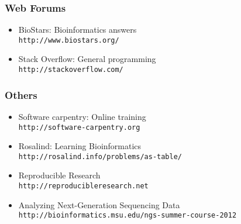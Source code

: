 \documentclass[ChapterTOCs,krantz2]{krantz} %
\begin{document}
\subsubsection{Web Forums}
\begin{itemize}
\item BioStars: Bioinformatics answers \\\texttt{http://www.biostars.org/}
\item Stack Overflow: General programming\\ \texttt{http://stackoverflow.com/}
\end{itemize}

\subsubsection{Others}
\begin{itemize}
\item Software carpentry: Online training
\\\texttt{http://software-carpentry.org}
\item Rosalind: Learning Bioinformatics \\\texttt{http://rosalind.info/problems/as-table/}
\item Reproducible Research \\\texttt{http://reproducibleresearch.net}
\item Analyzing Next-Generation Sequencing Data\\\texttt{http://bioinformatics.msu.edu/ngs-summer-course-2012}
\end{itemize}

 
\end{document}
